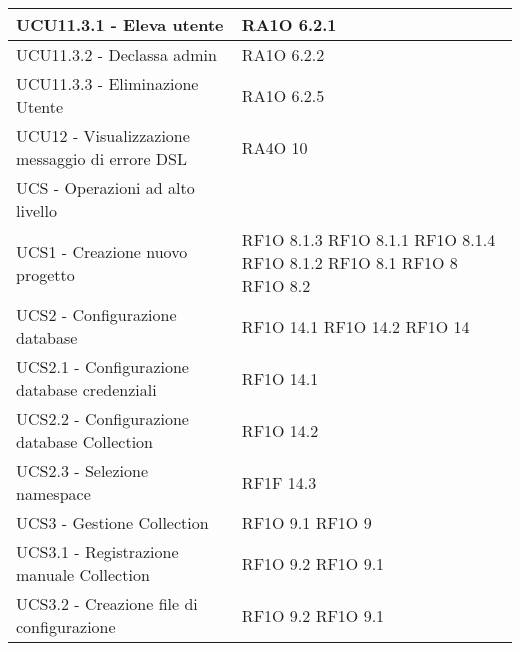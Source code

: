 \begin{center}
\begin{longtable}{ | p{5cm} | p{5cm} |}
            UCU11.3.1 - Eleva utente &  RA1O 6.2.1 \newline  \\ \hline      
            UCU11.3.2 - Declassa admin &  RA1O 6.2.2 \newline  \\ \hline      
            UCU11.3.3 - Eliminazione Utente &  RA1O 6.2.5 \newline  \\ \hline      
            UCU12 - Visualizzazione messaggio di errore DSL &  RA4O 10 \newline  \\ \hline      
            UCS - Operazioni ad alto livello &  \\ \hline      
            UCS1 - Creazione nuovo progetto &  RF1O 8.1.3  \newline  RF1O 8.1.1  \newline  RF1O 8.1.4  \newline  RF1O 8.1.2 \newline  RF1O 8.1  \newline  RF1O 8  \newline  RF1O 8.2  \newline  \\ \hline      
            UCS2 - Configurazione database &  RF1O 14.1 \newline  RF1O 14.2 \newline  RF1O 14 \newline  \\ \hline      
            UCS2.1 - Configurazione database credenziali &  RF1O 14.1 \newline  \\ \hline      
            UCS2.2 - Configurazione database Collection &  RF1O 14.2 \newline  \\ \hline      
            UCS2.3 - Selezione namespace &  RF1F 14.3 \newline  \\ \hline      
            UCS3 - Gestione Collection &  RF1O 9.1  \newline  RF1O 9  \newline  \\ \hline      
            UCS3.1 - Registrazione manuale Collection &  RF1O 9.2 \newline  RF1O 9.1  \newline  \\ \hline      
            UCS3.2 - Creazione file di configurazione &  RF1O 9.2 \newline  RF1O 9.1  \newline  \\ \hline      

\end{longtable}
\end{center}
